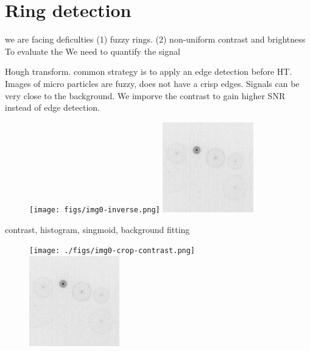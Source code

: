 \section{Ring detection}

we are facing deficulties
(1) fuzzy rings.
(2) non-uniform contrast and  brightness
To evaluate the We need to quantify the signal

Hough transform.
common strategy is to apply an edge detection before HT.
Images of micro particles are fuzzy, does not have a crisp edges. 
Signals can be very close to the background.
We imporve the contrast to gain higher SNR instead of edge detection.

\begin{figure}
\centering
\texttt{[image: figs/img0-inverse.png]}
\includegraphics[width=0.35\textwidth]{figs/img0-crop.png}
\end{figure}


contrast, histogram, singmoid, background fitting

\begin{figure}
\centering
\texttt{[image: ./figs/img0-crop-contrast.png]}
\includegraphics[width=0.35\textwidth]{figs/img0-crop.png}
\end{figure}


